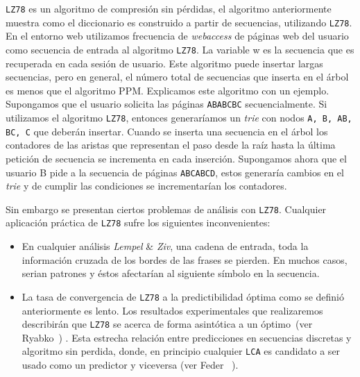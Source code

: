 \texttt{LZ78} es un algoritmo de compresión sin pérdidas, el algoritmo anteriormente muestra  como el diccionario es construido  a partir de secuencias, utilizando \texttt{LZ78}. En el entorno web utilizamos frecuencia de \emph{webaccess} de páginas web del usuario como secuencia de entrada al algoritmo \texttt{LZ78}. La variable w es la secuencia que es recuperada en cada sesión de usuario. Este algoritmo puede insertar largas secuencias, pero en general, el número total de secuencias que inserta en el árbol es menos que el algoritmo PPM. Explicamos este algoritmo con un ejemplo. Supongamos que el usuario solicita las páginas \texttt{ABABCBC} secuencialmente. Si utilizamos el algoritmo \texttt{LZ78}, entonces generaríamos un \emph{trie} con nodos  \texttt{A, B, AB, BC, C} que deberán insertar. 
Cuando se inserta una secuencia en el árbol los contadores de las aristas que representan el paso desde la raíz hasta la última petición de secuencia se incrementa en cada inserción. Supongamos ahora que el usuario B pide a la secuencia de páginas \texttt{ABCABCD}, estos generaría cambios en el \emph{trie} y de cumplir las condiciones se incrementarían los contadores. 






Sin embargo se presentan ciertos problemas de análisis con \texttt{LZ78}. Cualquier aplicación práctica de \texttt{LZ78} sufre  los siguientes inconvenientes: 

\begin{itemize}
	\item En cualquier análisis \emph{Lempel} \& \emph{Ziv}, una cadena de entrada, toda la información cruzada de los bordes de las frases se pierden. En muchos casos, serian patrones y éstos afectarían al siguiente símbolo en la secuencia.
	
	\item La tasa de convergencia de \texttt{LZ78} a la predictibilidad óptima como se definió anteriormente es lento. Los resultados experimentales que realizaremos  describirán que \texttt{LZ78} se acerca de forma asintótica a un óptimo~(ver Ryabko~\etal \cite{Ryabko2002}) . Esta estrecha relación entre predicciones en secuencias discretas y algoritmo sin perdida, donde, en principio cualquier \texttt{LCA} es candidato a ser usado como un predictor y viceversa (ver Feder \etal~\cite{Feder1992}). 
	
\end{itemize}









